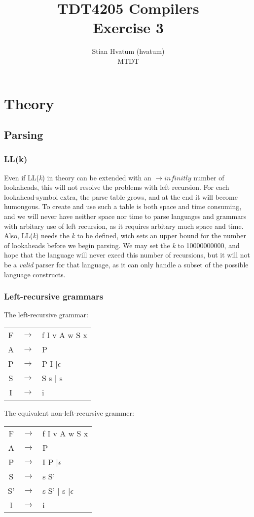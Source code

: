 \documentclass{article}
\title{TDT4205 Compilers\\
\Huge Exercise 3}
\author{Stian Hvatum (hvatum)\\MTDT}
\begin{document}
\maketitle

\section{Theory}
\subsection{Parsing}
\subsubsection{LL(k)}
Even if LL(\textit{k}) in theory can be extended with an $\rightarrow infinitly$
number of lookaheads, this will not resolve the problems with left recursion. For each
lookahead-symbol extra, the parse table grows, and at the end it will become
humongous. To create and use such a table is both space and time consuming, and
we will never have neither space nor time to parse languages and grammars with arbitary use of left
recursion, as it requires arbitary much space and time. Also, LL(\textit{k}) needs the
\textit{k} to be defined, wich sets an upper bound for the number of lookaheads
before we begin parsing. We may set the \textit{k} to 10000000000, and hope that
the language will never exeed this number of recursions, but it will not be a
\emph{valid} parser for that language, as it can only handle a subset of the
possible language constructs.

\subsubsection{Left-recursive grammars}
The left-recursive grammar:\\
\begin{tabular}{ccl}
F & $\rightarrow$ & f I v A w S x \\ 
A & $\rightarrow$ & P \\
P & $\rightarrow$ & P I $| \epsilon$\\ 
S & $\rightarrow$ & S s $|$ s\\
I & $\rightarrow$ & i\\
\end{tabular}


The equivalent non-left-recursive grammer:\\
\begin{tabular}{ccl}
F & $\rightarrow$ & f I v A w S x \\ 
A & $\rightarrow$ & P \\
P & $\rightarrow$ & I P $| \epsilon$\\ 
S & $\rightarrow$ & s S'\\
S' & $\rightarrow$ & s S' $|$ s $| \epsilon$\\
I & $\rightarrow$ & i\\
\end{tabular}
\end{document}
